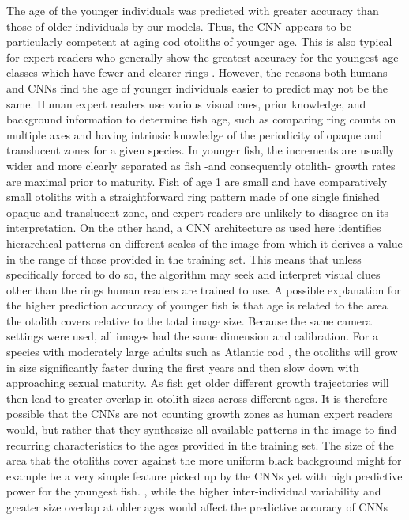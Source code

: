 \documentclass[10pt,letterpaper]{article}
\begin{document}
The age of the younger individuals was predicted with greater accuracy than those of older individuals by our models. Thus, the CNN appears to be particularly competent at aging cod otoliths of younger age. This is also  typical for expert readers who generally show the greatest accuracy for the youngest age classes which have fewer and clearer rings \citep{campana2001accuracy}. However, the reasons both humans and CNNs find the age of younger individuals easier to predict may not be the same. Human expert readers use various visual cues, prior knowledge, and background information to determine fish age, such as comparing ring counts on multiple axes and having intrinsic knowledge of the periodicity of opaque and translucent zones for a given species. In younger fish, the increments are usually wider and more clearly separated as fish -and consequently otolith- growth rates are maximal prior to maturity. Fish of age 1 are small and have comparatively small otoliths with a straightforward ring pattern made of one single finished opaque and translucent zone, and expert readers are unlikely to disagree on its interpretation.  On the other hand, a CNN architecture as used here identifies hierarchical patterns on different scales of the image from which it derives a value in the range of those provided in the training set. This means that unless specifically forced to do so, the algorithm may seek and interpret visual clues other than the rings human readers are trained to use.  A possible explanation for the higher prediction accuracy of younger fish is that age is related to the area the otolith covers relative to the total image size. Because the same camera settings were used, all images had the same dimension and calibration. For a species with moderately large adults such as Atlantic cod \citep{froese2022fishbase}, the otoliths will grow in size significantly faster during the first years and then slow down with approaching sexual maturity. As fish get older different growth trajectories will then lead to greater overlap in otolith sizes across different ages. It is therefore possible that the CNNs are not counting growth zones as human expert readers would, but rather that they synthesize all available patterns in the image to find recurring characteristics to the ages provided in the training set. The size of the area that the otoliths cover against the more uniform black background might for example be a very simple feature picked up by the CNNs yet with high predictive power for the youngest fish. , while the higher inter-individual variability and greater size overlap at older ages would affect the predictive accuracy of CNNs
\end{document}
